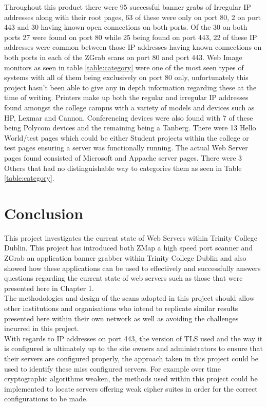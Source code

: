\documentclass[a4wide,leqno,12pt]{report}
\begin{document}
Throughout this product there were 95 successful banner grabs of Irregular IP addresses along with their root pages, 63 of these were only on port 80, 2 on port 443 and 30 having known open connections on both ports. Of the 30 on both ports 27 were found on port 80 while 25 being found on port 443, 22 of these IP addresses were common between those IP addresses having known connections on both ports in each of the ZGrab scans on port 80 and port 443. Web Image monitors as seen in table \ref{table:category} were one of the most seen types of systems with all of them being exclusively on port 80 only, unfortunately this project hasn't been able to give any in depth information regarding these at the time of writing. Printers make up both the regular and irregular IP addresses found amongst the college campus with a variety of models and devices such as HP, Lexmar and Cannon. Conferencing devices were also found with 7 of these being Polycom devices\cite{polycom} and the remaining being a Tanberg. There were 13 Hello World/test pages which could be either Student projects within the college or test pages ensuring a server was functionally running. The actual Web Server pages  found consisted of Microsoft and Appache server pages. There were 3 Others that had no distinguishable way to categories them as seen in Table \ref{table:category}.
\chapter{Conclusion}

This project investigates the current state of Web Servers within Trinity College Dublin. 
This project has introduced both ZMap a high speed port scanner and ZGrab an application banner grabber within Trinity College Dublin and also showed how these applications can be used to effectively and successfully answers questions regarding the current state of web servers such as those that were presented here in Chapter 1.\\

The methodologies and design of the scans adopted in this project should allow other institutions and organisations who intend to replicate similar results presented here within their own network as well as avoiding the challenges incurred in this project.\\

With regards to IP addresses on port 443, the version of TLS used and the way it is configured is ultimately up to the site owners and administrators to ensure that their servers are configured properly, the approach taken in this project could be used to identify these miss configured servers. For example over time cryptographic algorithms weaken, the methods used within this project could be implemented to locate servers offering weak cipher suites in order for the correct configurations to be made. 
\end{document}
